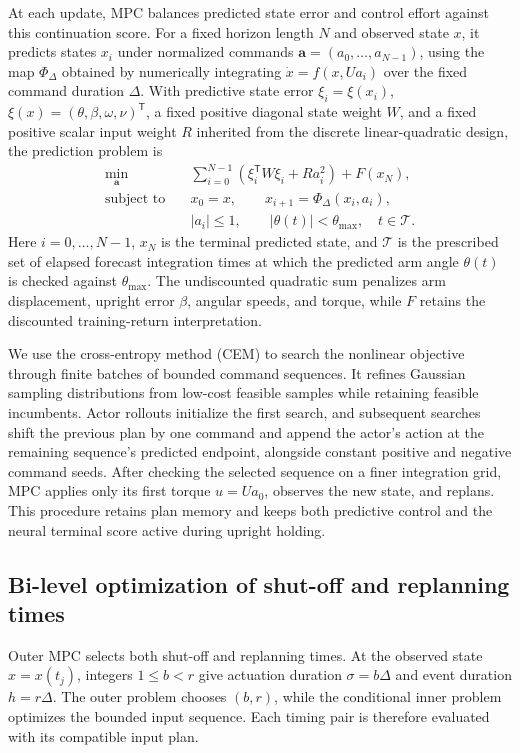 \documentclass[letterpaper,10pt,conference]{ieeeconf}
\begin{document}
At each update, MPC balances predicted state error and control effort against this continuation score. For a fixed horizon length $N$ and observed state $x$, it predicts states $x_i$ under normalized commands $\mathbf a=(a_0,\ldots,a_{N-1})$, using the map $\Phi_\Delta$ obtained by numerically integrating $\dot x=f(x,Ua_i)$ over the fixed command duration $\Delta$. With predictive state error $\xi_i=\xi(x_i)$, $\xi(x)=(\theta,\beta,\omega,\nu)^{\mathsf T}$, a fixed positive diagonal state weight $W$, and a fixed positive scalar input weight $R$ inherited from the discrete linear-quadratic design, the prediction problem is
\begin{equation}
\begin{aligned}
 \min_{\mathbf a}\quad&
 \sum_{i=0}^{N-1}\left(\xi_i^{\mathsf T}W\xi_i+Ra_i^2\right)+F(x_N),\\
 \text{subject to}\quad&x_0=x,\qquad x_{i+1}=\Phi_\Delta(x_i,a_i),\\
 &|a_i|\le1,\qquad |\theta(t)|<\theta_{\max},\quad t\in\mathcal T.
\end{aligned}
\label{eq:mpc-problem}
\end{equation}
Here $i=0,\ldots,N-1$, $x_N$ is the terminal predicted state, and $\mathcal T$ is the prescribed set of elapsed forecast integration times at which the predicted arm angle $\theta(t)$ is checked against $\theta_{\max}$. The undiscounted quadratic sum penalizes arm displacement, upright error $\beta$, angular speeds, and torque, while $F$ retains the discounted training-return interpretation.

We use the cross-entropy method (CEM) to search the nonlinear objective through finite batches of bounded command sequences. It refines Gaussian sampling distributions from low-cost feasible samples while retaining feasible incumbents. Actor rollouts initialize the first search, and subsequent searches shift the previous plan by one command and append the actor's action at the remaining sequence's predicted endpoint, alongside constant positive and negative command seeds. After checking the selected sequence on a finer integration grid, MPC applies only its first torque $u=Ua_0$, observes the new state, and replans. This procedure retains plan memory and keeps both predictive control and the neural terminal score active during upright holding.

\subsection{Bi-level optimization of shut-off and replanning times}
\label{sec:bilevel}
Outer MPC selects both shut-off and replanning times. At the observed state $x=x(t_j)$, integers $1\le b<r$ give actuation duration $\sigma=b\Delta$ and event duration $h=r\Delta$. The outer problem chooses $(b,r)$, while the conditional inner problem optimizes the bounded input sequence. Each timing pair is therefore evaluated with its compatible input plan.
\end{document}
